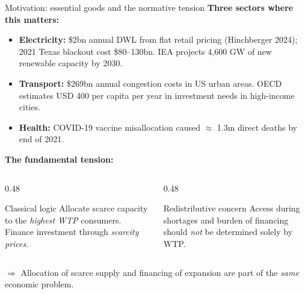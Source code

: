 \documentclass[10pt, aspectratio=169]{beamer}
\begin{document}
\begin{frame}{Motivation: essential goods and the normative tension}
\textbf{Three sectors where this matters:}
\begin{itemize}
\item \textbf{Electricity:} \$2bn annual DWL from flat retail pricing (Hinchberger 2024); 2021 Texas blackout cost \$80--130bn. IEA projects 4,600 GW of new renewable capacity by 2030.
\item \textbf{Transport:} \$269bn annual congestion costs in US urban areas. OECD estimates USD 400 per capita per year in investment needs in high-income cities.
\item \textbf{Health:} COVID-19 vaccine misallocation caused $\approx$ 1.3m direct deaths by end of 2021.
\end{itemize}
\vspace{0.3cm}
\textbf{The fundamental tension:}
\begin{columns}
\begin{column}{0.48\textwidth}
\begin{block}{Classical logic}
Allocate scarce capacity to the \emph{highest WTP} consumers. Finance investment through \emph{scarcity prices}.
\end{block}
\end{column}
\begin{column}{0.48\textwidth}
\begin{alertblock}{Redistributive concern}
Access during shortages and burden of financing should \emph{not} be determined solely by WTP.
\end{alertblock}
\end{column}
\end{columns}
\vspace{0.2cm}
$\Rightarrow$ Allocation of scarce supply and financing of expansion are part of the \emph{same} economic problem.
\end{frame}
\end{document}
